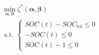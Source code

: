 \begin{equation}
\begin{split}
	&\min_{\boldsymbol{\alpha},\boldsymbol{\beta}} \zeta^*(\boldsymbol{\alpha}, \boldsymbol{\beta}) \\
	&\text{ s.t. }
	\begin{cases}
		SOC(t) - SOC_{tol} \leq 0\\
		-SOC(t) \leq 0\\
		SOC(t) - 1 \leq 0
	\end{cases}
\end{split}
\label{ch2:equ:cost-weights}
\end{equation}